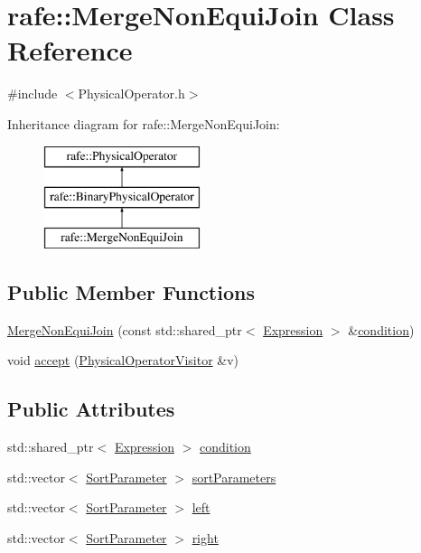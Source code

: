 \hypertarget{classrafe_1_1_merge_non_equi_join}{\section{rafe\+:\+:Merge\+Non\+Equi\+Join Class Reference}
\label{classrafe_1_1_merge_non_equi_join}
}


{\ttfamily \#include $<$Physical\+Operator.\+h$>$}

Inheritance diagram for rafe\+:\+:Merge\+Non\+Equi\+Join\+:\begin{figure}[H]
\begin{center}
\leavevmode
\includegraphics[height=3.000000cm]{classrafe_1_1_merge_non_equi_join}
\end{center}
\end{figure}
\subsection*{Public Member Functions}
\begin{DoxyCompactItemize}
\item 
\hyperlink{classrafe_1_1_merge_non_equi_join_addb7efb09c776ceb11250748001041ca}{Merge\+Non\+Equi\+Join} (const std\+::shared\+\_\+ptr$<$ \hyperlink{classrafe_1_1_expression}{Expression} $>$ \&\hyperlink{classrafe_1_1_merge_non_equi_join_a9082928b98835f698363bba69a77ffbe}{condition})
\item 
void \hyperlink{classrafe_1_1_merge_non_equi_join_a3accb9ad7ae5851370152885c23c6048}{accept} (\hyperlink{classrafe_1_1_physical_operator_visitor}{Physical\+Operator\+Visitor} \&v)
\end{DoxyCompactItemize}
\subsection*{Public Attributes}
\begin{DoxyCompactItemize}
\item 
std\+::shared\+\_\+ptr$<$ \hyperlink{classrafe_1_1_expression}{Expression} $>$ \hyperlink{classrafe_1_1_merge_non_equi_join_a9082928b98835f698363bba69a77ffbe}{condition}
\item 
std\+::vector$<$ \hyperlink{classrafe_1_1_sort_parameter}{Sort\+Parameter} $>$ \hyperlink{classrafe_1_1_merge_non_equi_join_af33e57260541cc8d7bda1905e2145983}{sort\+Parameters}
\item 
std\+::vector$<$ \hyperlink{classrafe_1_1_sort_parameter}{Sort\+Parameter} $>$ \hyperlink{classrafe_1_1_merge_non_equi_join_acbef8c68400bc4f58acdad98e3457545}{left}
\item 
std\+::vector$<$ \hyperlink{classrafe_1_1_sort_parameter}{Sort\+Parameter} $>$ \hyperlink{classrafe_1_1_merge_non_equi_join_a7083c038cc58409fc535d46f82633d6a}{right}
\end{DoxyCompactItemize}


